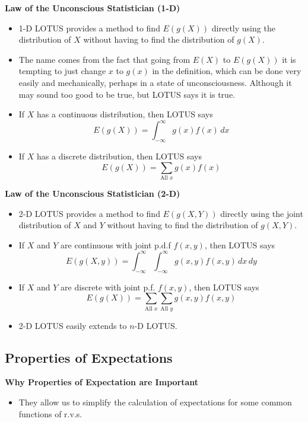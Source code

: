 \documentclass[11pt]{article}
\begin{document}
\textbf{Law of the Unconscious Statistician (1-D)}
\begin{itemize}
    \item 1-D LOTUS provides a method to find $E(g(X))$ directly using the distribution of $X$ 
    without having to find the distribution of $g(X)$.
    \item The name comes from the fact that going from $E(X)$ to $E(g(X))$ it is tempting to 
    just change $x$ to $g(x)$ in the definition, which can be done very easily and 
    mechanically, perhaps in a state of unconsciousness. Although it may sound too good to be 
    true, but LOTUS says it is true. 
    \item If $X$ has a continuous distribution, then LOTUS says
    \[E(g(X)) = \int_{-\infty}^{\infty} g(x) f(x) \,dx\]
    \item If $X$ has a discrete distribution, then LOTUS says
    \[E(g(X)) = \sum_{\text{All } x} g(x) f(x)\]
\end{itemize}

\textbf{Law of the Unconscious Statistician (2-D)}
\begin{itemize}
    \item 2-D LOTUS provides a method to find $E(g(X,Y))$ directly using the joint 
    distribution of $X$ and $Y$ without having to find the distribution of $g(X,Y)$.
    \item If $X$ and $Y$ are continuous with joint p.d.f $f(x,y)$, then LOTUS says
    \[E(g(X,y)) = \int_{-\infty}^{\infty} \int_{-\infty}^{\infty} g(x,y) f(x,y) \,dx \,dy\]
    \item If $X$ and $Y$ are discrete with joint p.f. $f(x,y)$, then LOTUS says
    \[E(g(X)) = \sum_{\text{All } x} \sum_{\text{All } y} g(x,y) f(x,y)\]
    \item 2-D LOTUS easily extends to $n$-D LOTUS.
\end{itemize}

\subsection{Properties of Expectations}

\textbf{Why Properties of Expectation are Important}
\begin{itemize}
    \item They allow us to simplify the calculation of expectations for some common functions
    of r.v.s.
\end{itemize}
\end{document}
